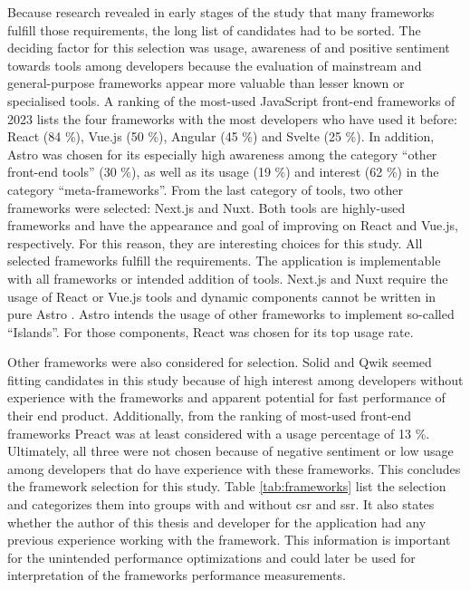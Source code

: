 \documentclass[a4paper, 12pt]{article}
\begin{document}
Because research revealed in early stages of the study that many frameworks fulfill those requirements, the long list of candidates had to be sorted.
The deciding factor for this selection was usage, awareness of and positive sentiment towards tools among developers because the evaluation of mainstream and general-purpose frameworks appear more valuable than lesser known or specialised tools.
A ranking of the most-used JavaScript front-end frameworks of 2023 \citep{stateOfJs2023} lists the four frameworks with the most developers who have used it before: React (84 \%), Vue.js (50 \%), Angular (45 \%) and Svelte (25 \%).
In addition, Astro was chosen for its especially high awareness among the category \enquote{other front-end tools} (30 \%), as well as its usage (19 \%) and interest (62 \%) in the category \enquote{meta-frameworks}.
From the last category of tools, two other frameworks were selected: Next.js and Nuxt.
Both tools are highly-used frameworks and have the appearance and goal of improving on React and Vue.js, respectively.
For this reason, they are interesting choices for this study.
All selected frameworks fulfill the requirements.
The application is implementable with all frameworks or intended addition of tools.
Next.js and Nuxt require the usage of React or Vue.js tools and dynamic components cannot be written in pure Astro \citep{AstroIslands}.
Astro intends the usage of other frameworks to implement so-called \enquote{Islands}.
For those components, React was chosen for its top usage rate.

Other frameworks were also considered for selection.
Solid and Qwik seemed fitting candidates in this study because of high interest among developers without experience with the frameworks and apparent potential for fast performance of their end product.
Additionally, from the ranking of most-used front-end frameworks Preact was at least considered with a usage percentage of 13 \%.
Ultimately, all three were not chosen because of negative sentiment or low usage among developers that do have experience with these frameworks.
This concludes the framework selection for this study.
Table \ref{tab:frameworks} list the selection and categorizes them into groups with and without \acrshort{csr} and \acrshort{ssr}.
It also states whether the author of this thesis and developer for the application had any previous experience working with the framework.
This information is important for the unintended performance optimizations and could later be used for interpretation of the frameworks performance measurements.
\end{document}
